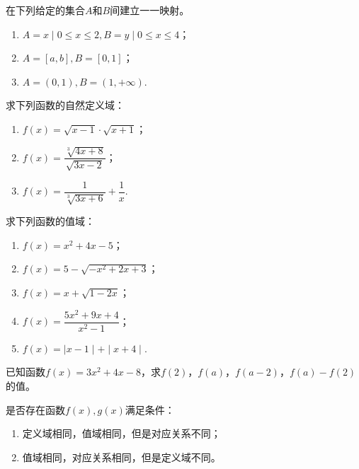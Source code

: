 \documentclass[lang=cn,math=cm,chinesefont=nofont,11pt,scheme=chinese,onecol]{elegantbook}
\begin{document}
\begin{exercise}
  在下列给定的集合$A$和$B$间建立一一映射。
\end{exercise}

\begin{enumerate}
  \item $A={x\mid 0\leqslant x\leqslant 2},B={y\mid 0\leqslant x\leqslant 4}$；
  \item $A=[a,b],B=[0,1]$；
  \item $A=(0,1),B=(1,+\infty)$.
\end{enumerate}

\begin{exercise}
  求下列函数的自然定义域：
\end{exercise}

\begin{spacing}{1.8}
  \begin{enumerate}
  \item $f(x)=\sqrt{x-1}\cdot\sqrt{x+1}$；
  \item $f(x)=\dfrac{\sqrt[3]{4x+8}}{\sqrt{3x-2}}$；
  \item $f(x)=\dfrac1{\sqrt[3]{3x+6}}+\dfrac1x$.
  \end{enumerate}
\end{spacing}

\begin{exercise}
  求下列函数的值域：
\end{exercise}

\begin{enumerate}
  \item $f(x)=x^2+4x-5$；
  \item $f(x)=5-\sqrt{-x^{2}+2x+3}$；
  \item $f(x)=x+\sqrt{1-2x}$；
  \item \begin{spacing}{1.8}$f(x)=\dfrac{5x^{2}+9x+4}{x^{2}-1}$；\end{spacing}
  \item $f(x)=\mid x-1\mid+\mid x+4\mid $.
\end{enumerate}

\begin{exercise}
  已知函数$f(x)=3x^2+4x-8$，求$f(2)$，$f(a)$，$f(a-2)$，$f(a)-f(2)$的值。
\end{exercise}

\begin{exercise}\label{2017RJA.P74.17}
  是否存在函数$f(x),g(x)$满足条件：
\end{exercise}

\begin{enumerate}
  \item 定义域相同，值域相同，但是对应关系不同；
  \item 值域相同，对应关系相同，但是定义域不同。
\end{enumerate}
\end{document}

